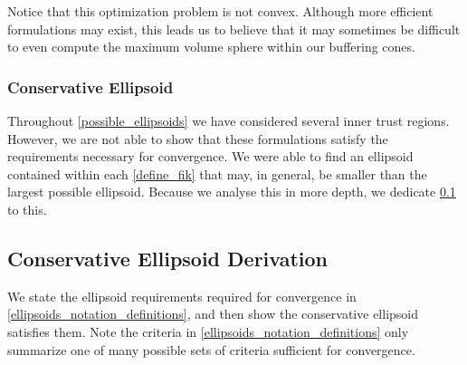 Notice that this optimization problem is not convex.
Although more efficient formulations may exist, this leads us to believe that it may sometimes be difficult to even compute the maximum volume sphere within our buffering cones.

\subsubsection{Conservative Ellipsoid}
Throughout \cref{possible_ellipsoids} we have considered several inner trust regions.
However, we are not able to show that these formulations satisfy the requirements necessary for convergence.
We were able to find an ellipsoid contained within each \cref{define_fik} that may, in general, be smaller than the largest possible ellipsoid.
Because we analyse this in more depth, we dedicate \cref{constructing_and_analysizing_conservative_ellipsoid} to this.

\subsection{Conservative Ellipsoid Derivation}
\label{constructing_and_analysizing_conservative_ellipsoid}

We state the ellipsoid requirements required for convergence in \cref{ellipsoids_notation_definitions}, and then show the conservative ellipsoid satisfies them.
Note the criteria in \cref{ellipsoids_notation_definitions} only summarize one of many possible sets of criteria sufficient for convergence.

